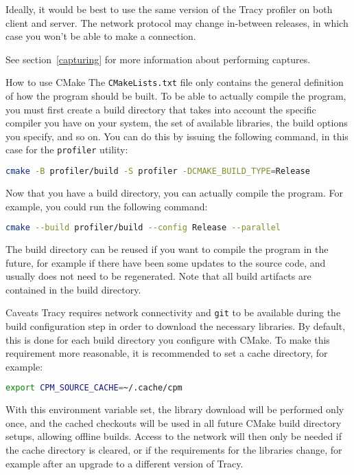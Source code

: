 \documentclass[hidelinks,titlepage,a4paper,twoside]{article}
\begin{document}
Ideally, it would be best to use the same version of the Tracy profiler on both client and server. The network protocol may change in-between releases, in which case you won't be able to make a connection.

See section~\ref{capturing} for more information about performing captures.

\begin{bclogo}[
noborder=true,
couleur=black!5,
logo=\bclampe
]{How to use CMake}
The \texttt{CMakeLists.txt} file only contains the general definition of how the program should be built. To be able to actually compile the program, you must first create a build directory that takes into account the specific compiler you have on your system, the set of available libraries, the build options you specify, and so on. You can do this by issuing the following command, in this case for the \texttt{profiler} utility:

\begin{lstlisting}[language=sh]
cmake -B profiler/build -S profiler -DCMAKE_BUILD_TYPE=Release
\end{lstlisting}

Now that you have a build directory, you can actually compile the program. For example, you could run the following command:

\begin{lstlisting}[language=sh]
cmake --build profiler/build --config Release --parallel
\end{lstlisting}

The build directory can be reused if you want to compile the program in the future, for example if there have been some updates to the source code, and usually does not need to be regenerated. Note that all build artifacts are contained in the build directory.
\end{bclogo}

\begin{bclogo}[
noborder=true,
couleur=black!5,
logo=\bcattention
]{Caveats}
Tracy requires network connectivity and \texttt{git} to be available during the build configuration step in order to download the necessary libraries. By default, this is done for each build directory you configure with CMake. To make this requirement more reasonable, it is recommended to set a cache directory, for example:

\begin{lstlisting}[language=sh]
export CPM_SOURCE_CACHE=~/.cache/cpm
\end{lstlisting}

With this environment variable set, the library download will be performed only once, and the cached checkouts will be used in all future CMake build directory setups, allowing offline builds. Access to the network will then only be needed if the cache directory is cleared, or if the requirements for the libraries change, for example after an upgrade to a different version of Tracy.
\end{bclogo}
\end{document}
